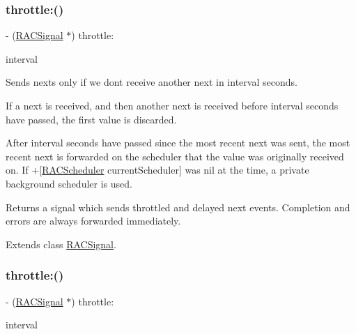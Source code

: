 \subsubsection{\texorpdfstring{throttle\+:()}{throttle:()}\hspace{0.1cm}{\footnotesize\ttfamily [1/3]}}
{\footnotesize\ttfamily -\/ (\mbox{\hyperlink{interface_r_a_c_signal}{R\+A\+C\+Signal}} $\ast$) throttle\+: \begin{DoxyParamCaption}\item[{(N\+S\+Time\+Interval)}]{interval }\end{DoxyParamCaption}}

Sends {\ttfamily next}s only if we don\textquotesingle{}t receive another {\ttfamily next} in {\ttfamily interval} seconds.

If a {\ttfamily next} is received, and then another {\ttfamily next} is received before {\ttfamily interval} seconds have passed, the first value is discarded.

After {\ttfamily interval} seconds have passed since the most recent {\ttfamily next} was sent, the most recent {\ttfamily next} is forwarded on the scheduler that the value was originally received on. If +\mbox{[}\mbox{\hyperlink{interface_r_a_c_scheduler}{R\+A\+C\+Scheduler}} current\+Scheduler\mbox{]} was nil at the time, a private background scheduler is used.

Returns a signal which sends throttled and delayed {\ttfamily next} events. Completion and errors are always forwarded immediately. 

Extends class \mbox{\hyperlink{interface_r_a_c_signal_a2542ae804d05ec734d0f4d2fa8c3ac93}{R\+A\+C\+Signal}}.

\mbox{\label{category_r_a_c_signal_07_operations_08_a2542ae804d05ec734d0f4d2fa8c3ac93}} 
\subsubsection{\texorpdfstring{throttle\+:()}{throttle:()}\hspace{0.1cm}{\footnotesize\ttfamily [2/3]}}
{\footnotesize\ttfamily -\/ (\mbox{\hyperlink{interface_r_a_c_signal}{R\+A\+C\+Signal}} $\ast$) throttle\+: \begin{DoxyParamCaption}\item[{(N\+S\+Time\+Interval)}]{interval }\end{DoxyParamCaption}}

